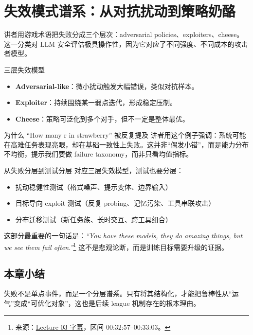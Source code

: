 \section{失效模式谱系：从对抗扰动到策略奶酪}

讲者用游戏术语把失败分成三个层次：adversarial policies、exploiters、cheese。这一分类对 LLM 安全评估极具操作性，因为它对应了不同强度、不同成本的攻击者模型。

\begin{knowledgebox}{三层失效模型}
\begin{itemize}
    \item \textbf{Adversarial-like}：微小扰动触发大幅错误，类似对抗样本。
    \item \textbf{Exploiter}：持续围绕某一弱点迭代，形成稳定压制。
    \item \textbf{Cheese}：策略可泛化到多个对手，但不一定是整体最优。
\end{itemize}
\end{knowledgebox}

\begin{warningbox}{为什么 ``How many r in strawberry'' 被反复提及}
讲者用这个例子强调：系统可能在高难任务表现亮眼，却在基础一致性上失败。这并非``偶发小错''，而是能力分布不均衡，提示我们要做 failure taxonomy，而非只看均值指标。
\end{warningbox}

\begin{importantbox}{从失败分层到测试分层}
对应三层失效模型，测试也要分层：
\begin{itemize}
    \item 扰动稳健性测试（格式噪声、提示变体、边界输入）
    \item 目标导向 exploit 测试（反复 probing、记忆污染、工具串联攻击）
    \item 分布迁移测试（新任务族、长时交互、跨工具组合）
\end{itemize}
\end{importantbox}

这部分最重要的一句话是：\textit{``You have these models, they do amazing things, but we see them fail often.''}\footnote{来源：\href{https://www.youtube.com/watch?v=ntjOxjZMaac}{Lecture 03 字幕}，区间 00:32:57--00:33:03。} 这不是悲观论断，而是训练目标需要升级的证据。

\subsection{本章小结}
失败不是单点事件，而是一个分层谱系。只有将其结构化，才能把鲁棒性从``运气''变成``可优化对象''，这也是后续 league 机制存在的根本理由。

